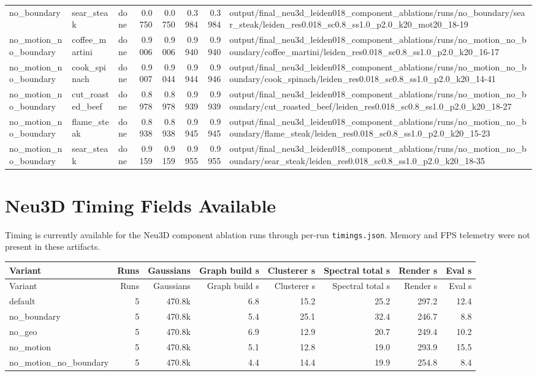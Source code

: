 \documentclass[10pt]{article}
\begin{document}
\begin{longtable}{lllrrrrp{9cm}}
no\_boundary & sear\_steak & done & 0.0750 & 0.0750 & 0.3984 & 0.3984 & output/final\_neu3d\_leiden018\_component\_ablations/runs/no\_boundary/sear\_steak/leiden\_res0.018\_sc0.8\_ss1.0\_p2.0\_k20\_mot20\_18-19 \\
no\_motion\_no\_boundary & coffee\_martini & done & 0.9006 & 0.9006 & 0.9940 & 0.9940 & output/final\_neu3d\_leiden018\_component\_ablations/runs/no\_motion\_no\_boundary/coffee\_martini/leiden\_res0.018\_sc0.8\_ss1.0\_p2.0\_k20\_16-17 \\
no\_motion\_no\_boundary & cook\_spinach & done & 0.9007 & 0.9044 & 0.9944 & 0.9946 & output/final\_neu3d\_leiden018\_component\_ablations/runs/no\_motion\_no\_boundary/cook\_spinach/leiden\_res0.018\_sc0.8\_ss1.0\_p2.0\_k20\_14-41 \\
no\_motion\_no\_boundary & cut\_roasted\_beef & done & 0.8978 & 0.8978 & 0.9939 & 0.9939 & output/final\_neu3d\_leiden018\_component\_ablations/runs/no\_motion\_no\_boundary/cut\_roasted\_beef/leiden\_res0.018\_sc0.8\_ss1.0\_p2.0\_k20\_18-27 \\
no\_motion\_no\_boundary & flame\_steak & done & 0.8938 & 0.8938 & 0.9945 & 0.9945 & output/final\_neu3d\_leiden018\_component\_ablations/runs/no\_motion\_no\_boundary/flame\_steak/leiden\_res0.018\_sc0.8\_ss1.0\_p2.0\_k20\_15-23 \\
no\_motion\_no\_boundary & sear\_steak & done & 0.9159 & 0.9159 & 0.9955 & 0.9955 & output/final\_neu3d\_leiden018\_component\_ablations/runs/no\_motion\_no\_boundary/sear\_steak/leiden\_res0.018\_sc0.8\_ss1.0\_p2.0\_k20\_18-35 \\
\bottomrule
\end{longtable}
\normalsize

\section{Neu3D Timing Fields Available}
Timing is currently available for the Neu3D component ablation runs through per-run \texttt{timings.json}. Memory and FPS telemetry were not present in these artifacts.
\small
\begin{longtable}{lrrrrrrr}
\toprule
Variant & Runs & Gaussians & Graph build s & Clusterer s & Spectral total s & Render s & Eval s \\
\midrule
\endfirsthead
\toprule
Variant & Runs & Gaussians & Graph build s & Clusterer s & Spectral total s & Render s & Eval s \\
\midrule
\endhead
default & 5 & 470.8k & 6.8 & 15.2 & 25.2 & 297.2 & 12.4 \\
no\_boundary & 5 & 470.8k & 5.4 & 25.1 & 32.4 & 246.7 & 8.8 \\
no\_geo & 5 & 470.8k & 6.9 & 12.9 & 20.7 & 249.4 & 10.2 \\
no\_motion & 5 & 470.8k & 5.1 & 12.8 & 19.0 & 293.9 & 15.5 \\
no\_motion\_no\_boundary & 5 & 470.8k & 4.4 & 14.4 & 19.9 & 254.8 & 8.4 \\
\bottomrule
\end{longtable}
\normalsize
\end{document}
